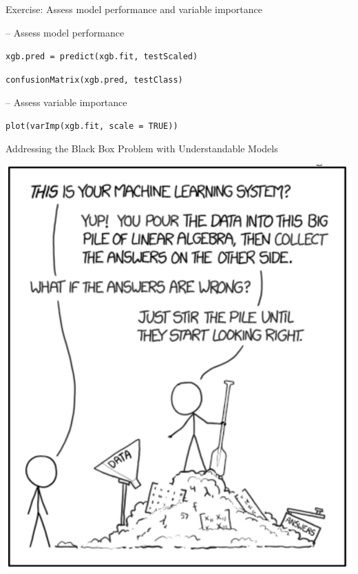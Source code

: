 \documentclass[ignorenonframetext,]{beamer}
\begin{document}
\begin{frame}[fragile]{Exercise: Assess model performance and variable
importance}

-- Assess model performance

\texttt{xgb.pred\ =\ predict(xgb.fit,\ testScaled)}

\texttt{confusionMatrix(xgb.pred,\ testClass)}

-- Assess variable importance

\texttt{plot(varImp(xgb.fit,\ scale\ =\ TRUE))}

\end{frame}

\begin{frame}{Addressing the Black Box Problem with Understandable
Models}

\includegraphics[width=0.43\linewidth]{MatrixAlgebraCartoon}

\end{frame}
\end{document}
